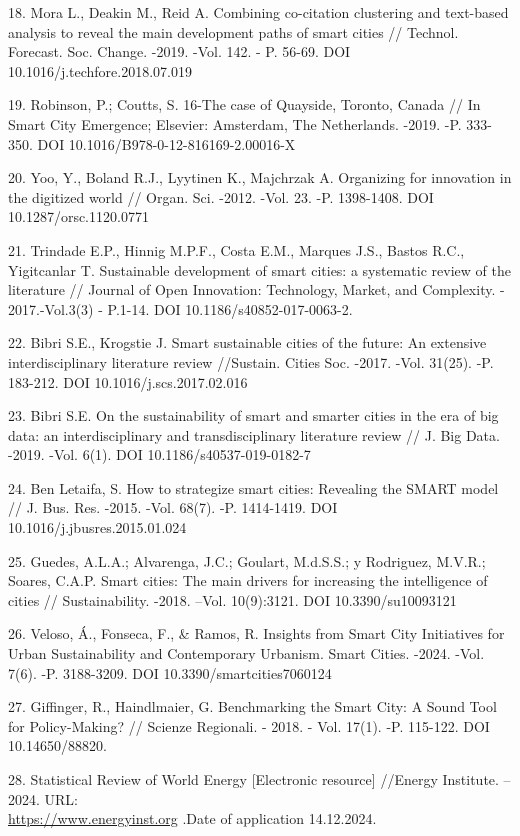 \begin{references}
18. Mora L., Deakin M., Reid A. Combining co-citation clustering and
text-based analysis to reveal the main development paths of smart
cities // Technol. Forecast. Soc. Change. -2019. -Vol. 142. - P.
56-69. DOI 10.1016/j.techfore.2018.07.019

19. Robinson, P.; Coutts, S. 16-The case of Quayside, Toronto, Canada //
In Smart City Emergence; Elsevier: Amsterdam, The Netherlands. -2019.
-P. 333-350. DOI 10.1016/B978-0-12-816169-2.00016-X

20. Yoo, Y., Boland R.J., Lyytinen K., Majchrzak A. Organizing for
innovation in the digitized world // Organ. Sci. -2012. -Vol. 23. -P.
1398-1408. DOI 10.1287/orsc.1120.0771

21. Trindade E.P., Hinnig M.P.F., Costa E.M., Marques J.S., Bastos R.C.,
Yigitcanlar T. Sustainable development of smart cities: a systematic
review of the literature // Journal of Open Innovation: Technology,
Market, and Complexity. - 2017.-Vol.3(3) - P.1-14.
DOI 10.1186/s40852-017-0063-2.

22. Bibri S.E., Krogstie J. Smart sustainable cities of the future: An
extensive interdisciplinary literature review //Sustain. Cities Soc.
-2017. -Vol. 31(25). -P. 183-212.
DOI 10.1016/j.scs.2017.02.016

23. Bibri S.E. On the sustainability of smart and smarter cities in the
era of big data: an interdisciplinary and transdisciplinary literature
review // J. Big Data. -2019. -Vol. 6(1). DOI
10.1186/s40537-019-0182-7

24. Ben Letaifa, S. How to strategize smart cities: Revealing the SMART
model // J. Bus. Res. -2015. -Vol. 68(7). -P. 1414-1419. DOI
10.1016/j.jbusres.2015.01.024

25. Guedes, A.L.A.; Alvarenga, J.C.; Goulart, M.d.S.S.; y Rodriguez,
M.V.R.; Soares, C.A.P. Smart cities: The main drivers for increasing
the intelligence of cities // Sustainability. -2018. --Vol.
10(9):3121. DOI 10.3390/su10093121

26. Veloso, Á., Fonseca, F., \& Ramos, R. Insights from Smart City
Initiatives for Urban Sustainability and Contemporary Urbanism. Smart
Cities. -2024. -Vol. 7(6). -P. 3188-3209. DOI
10.3390/smartcities7060124

27. Giffinger, R., Haindlmaier, G. Benchmarking the Smart City: A Sound
Tool for Policy-Making? // Scienze Regionali. - 2018. - Vol. 17(1).
-P. 115-122. DOI 10.14650/88820.

28. Statistical Review of World Energy {[}Electronic resource{]} //Energy
Institute. -- 2024. URL: \\\href{https://www.energyinst.org/statistical-review}{https://www.energyinst.org}
.Date of application 14.12.2024.
\end{references}

